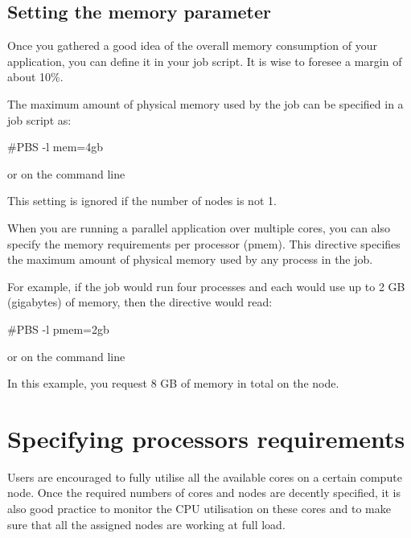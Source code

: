 \begin{prompt}
\end{prompt}

\subsection{Setting the memory parameter}

Once you gathered a good idea of the overall memory consumption of your
application, you can define it in your job script.  It is wise to foresee a
margin of about 10\%.


The maximum amount of physical memory used by the job can be specified in a job
script as:

\begin{prompt}
#PBS -l mem=4gb
\end{prompt}

or on the command line
\begin{prompt}
\end{prompt}

This setting is ignored if the number of nodes is not 1.


When you are running a parallel application over multiple cores, you can also
specify the memory requirements per processor (pmem). This directive specifies
the maximum amount of physical memory used by any process in the job.

For example, if the job would run four processes and each would use up to 2 GB
(gigabytes) of memory, then the directive would read:

\begin{prompt}
#PBS -l pmem=2gb
\end{prompt}

or on the command line
\begin{prompt}
\end{prompt}

In this example, you request 8 GB of memory in total on the node.

\section{Specifying processors requirements}

Users are encouraged to fully utilise all the available cores on a certain
compute node. Once the required numbers of cores and nodes are decently
specified, it is also good practice to monitor the CPU utilisation on these
cores and to make sure that all the assigned nodes are working at full load.

